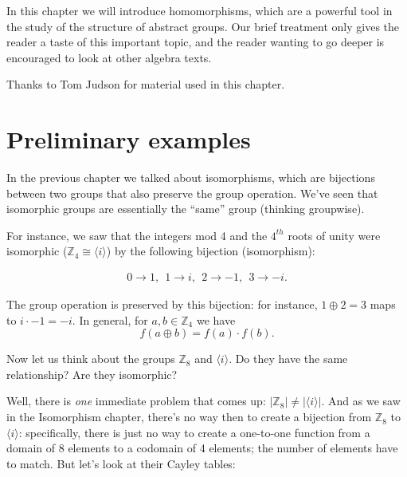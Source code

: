 



In this chapter we will introduce homomorphisms, which are a powerful tool in the study of the structure of abstract groups. Our brief treatment only gives the reader a taste of this important topic, and the reader wanting to go deeper is encouraged to look at other algebra texts.
\bigskip

Thanks to Tom Judson for material used in this chapter.
 
\section{Preliminary examples}
\label{sec:Homomorphism:Introduction}

  
In the previous chapter we talked about isomorphisms, which are bijections between two groups that also preserve
the group operation. We've seen that isomorphic groups are essentially the ``same'' group (thinking groupwise). 

For instance, we saw that the integers mod 4 and the $4^{th}$ roots of unity were isomorphic (${\mathbb Z_4} \cong \langle i \rangle$)  by the following bijection (isomorphism):

\begin{align*}
    0 \rightarrow 1 ,~~     1 \rightarrow i,~~    2 \rightarrow -1,~~   3 \rightarrow -i.
\end{align*}

The group operation is preserved by this bijection:  for instance, $1  \oplus 2=3$ maps to 
$i \cdot -1 = -i$.
In general, for $a,b \in {\mathbb Z_4}$ we have
$$f(a \oplus b) = f(a) \cdot f(b).$$

 Now let us think about the groups \emph{ ${\mathbb Z_8}$} and $\langle i \rangle$.  Do they have the same relationship?  Are they isomorphic? 

Well, there is \emph{one} immediate problem that comes up:  $|{\mathbb Z_8}| \neq |\langle i \rangle|$.  And as we saw in the Isomorphism chapter, there's no way then to create a bijection from ${\mathbb Z_8}$ to $\langle i \rangle$:  specifically, there is just no way to create a one-to-one function from a domain of 8 elements to a codomain of 4 elements; the number of elements have to match.  But  let's look at their Cayley tables:

